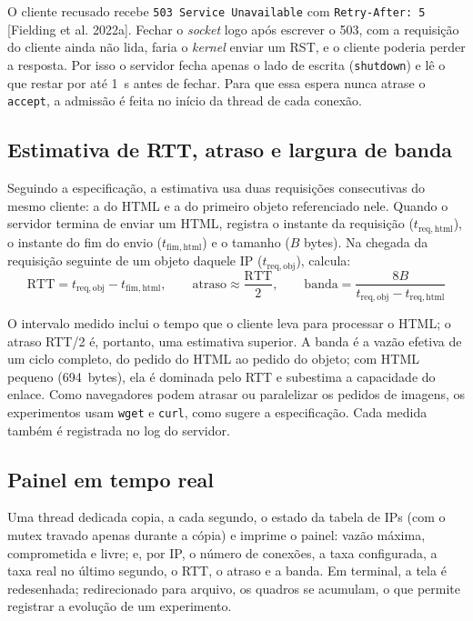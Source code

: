 \documentclass[12pt,a4paper]{article}
\begin{document}
O cliente recusado recebe \texttt{503 Service Unavailable} com
\texttt{Retry-After: 5} [Fielding et al. 2022a]. Fechar o \textit{socket} logo após
escrever o 503, com a requisição do cliente ainda não lida, faria o \textit{kernel} enviar
um RST, e o cliente poderia perder a resposta. Por isso o servidor fecha apenas o lado de
escrita (\texttt{shutdown}) e lê o que restar por até 1~s antes de fechar. Para que essa
espera nunca atrase o \texttt{accept}, a admissão é feita no início da thread de cada
conexão.

\subsection{Estimativa de RTT, atraso e largura de banda}

Seguindo a especificação, a estimativa usa duas requisições consecutivas do mesmo
cliente: a do HTML e a do primeiro objeto referenciado nele. Quando o servidor termina de
enviar um HTML, registra o instante da requisição ($t_{\mathrm{req,html}}$), o instante
do fim do envio ($t_{\mathrm{fim,html}}$) e o tamanho ($B$ bytes). Na chegada da
requisição seguinte de um objeto daquele IP ($t_{\mathrm{req,obj}}$), calcula:
\begin{equation}
\mathrm{RTT} = t_{\mathrm{req,obj}} - t_{\mathrm{fim,html}}, \qquad
\text{atraso} \approx \frac{\mathrm{RTT}}{2}, \qquad
\text{banda} = \frac{8B}{t_{\mathrm{req,obj}} - t_{\mathrm{req,html}}}
\end{equation}

O intervalo medido inclui o tempo que o cliente leva para processar o HTML; o atraso
RTT/2 é, portanto, uma estimativa superior. A banda é a vazão efetiva de um ciclo
completo, do pedido do HTML ao pedido do objeto; com HTML pequeno (694~bytes), ela é
dominada pelo RTT e subestima a capacidade do enlace. Como navegadores podem atrasar ou
paralelizar os pedidos de imagens, os experimentos usam \texttt{wget} e \texttt{curl},
como sugere a especificação. Cada medida também é registrada no log do servidor.

\subsection{Painel em tempo real}

Uma thread dedicada copia, a cada segundo, o estado da tabela de IPs (com o mutex travado
apenas durante a cópia) e imprime o painel: vazão máxima, comprometida e livre; e, por IP,
o número de conexões, a taxa configurada, a taxa real no último segundo, o RTT, o atraso e
a banda. Em terminal, a tela é redesenhada; redirecionado para arquivo, os quadros se
acumulam, o que permite registrar a evolução de um experimento.
\end{document}
